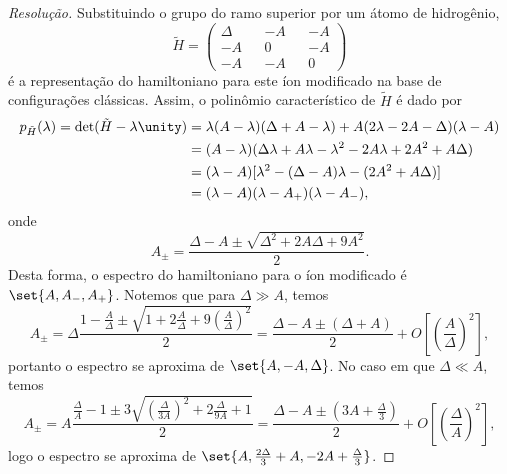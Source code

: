 \begin{proof}[Resolução]
    Substituindo o grupo  do ramo superior por um átomo de hidrogênio,
    \begin{equation*}
        \tilde{H} = \begin{pmatrix}
            \Delta &&-A &&-A\\
            -A&& 0 &&-A\\
            -A&& -A&&0
        \end{pmatrix}
    \end{equation*}
    é a representação do hamiltoniano para este íon modificado na base de configurações clássicas. Assim, o polinômio característico de \(\tilde{H}\) é dado por
    \begin{align*}
        p_{\tilde{H}}(\lambda) = \det(\tilde{H} - \lambda \unity) &= \lambda (A - \lambda) (\Delta + A - \lambda) + A (2 \lambda - 2A - \Delta)(\lambda - A)\\
                                                                  &= (A - \lambda)(\Delta\lambda + A \lambda - \lambda^2 - 2A \lambda + 2A^2 + A \Delta)\\
                                                                  &= (\lambda - A)[\lambda^2 - (\Delta - A)\lambda - (2A^2 + A \Delta)]\\
                                                                  &= (\lambda - A)(\lambda - A_+)(\lambda - A_-),
    \end{align*}
    onde
    \begin{equation*}
        A_{\pm} = \frac{\Delta - A \pm \sqrt{\Delta^2 + 2A \Delta + 9A^2}}{2}.
    \end{equation*}
    Desta forma, o espectro do hamiltoniano para o íon modificado é \(\set{A, A_-, A_+}\). Notemos que para \(\Delta \gg A\), temos
    \begin{equation*}
        A_\pm = \Delta \frac{1 - \frac{A}{\Delta} \pm \sqrt{1 + 2\frac{A}{\Delta} + 9\left(\frac{A}{\Delta}\right)^2}}{2} = \frac{\Delta - A \pm (\Delta + A)}{2} + O\left[\left(\frac{A}{\Delta}\right)^2\right],
    \end{equation*}
    portanto o espectro se aproxima de \(\set{A, -A, \Delta}\). No caso em que \(\Delta \ll A\), temos
    \begin{equation*}
        A_{\pm} = A\frac{\frac{\Delta}{A} - 1 \pm 3\sqrt{\left(\frac{\Delta}{3A}\right)^2 + 2\frac{\Delta}{9A} + 1}}{2} = \frac{\Delta - A \pm (3A + \frac{\Delta}{3})}{2} + O\left[\left(\frac{\Delta}{A}\right)^2\right],
    \end{equation*}
    logo o espectro se aproxima de \(\set{A, \frac{2 \Delta}{3} + A, -2A + \frac{\Delta}{3}}\).


\end{proof}
